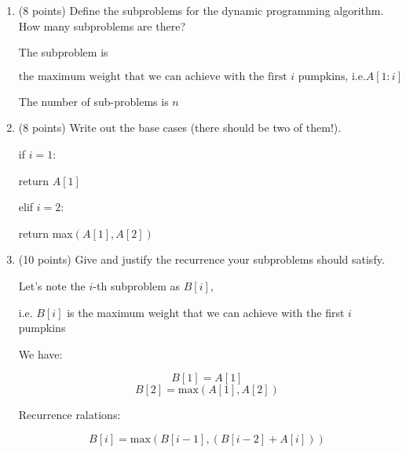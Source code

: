\begin{enumerate}
    \item (8 points)
    Define the subproblems
    for the dynamic programming algorithm.
    How many subproblems are there?
    \begin{solution}
         
        \vspace{0.4cm}

        The subproblem is 

        \[
        \text{the maximum weight that we can achieve with the first } i \text{ pumpkins, i.e.}A[1:i]
        \]
        
        The number of sub-problems is $n$



        
    \end{solution}
    \item (8 points) Write out the base cases (there should be two of them!).
    \begin{solution}
        \vspace{0.2cm}

        if $i = 1$:
        
        \hspace{1cm} return $A[1]$
        
        elif $i = 2$:
        
        \hspace{1cm} return max$(A[1],A[2])$


        
    \end{solution}
    \item (10 points) Give and justify the recurrence your subproblems should satisfy. 
    \begin{solution}
        \vspace{0.5cm}

        Let's note the $i$-th subproblem as $B[i]$, 
        
        i.e. $B[i]$ is the maximum weight that we can achieve with the first $i$ pumpkins
        
        \vspace{0.4cm}

        We have:

        \[B[1] = A[1]\]
        \[B[2] = \text{max}(A[1],A[2])\]

        Recurrence ralations:

        \[B[i] = \text{max}(B[i-1],(B[i-2]+A[i]))\]


\end{solution}
\end{enumerate}
